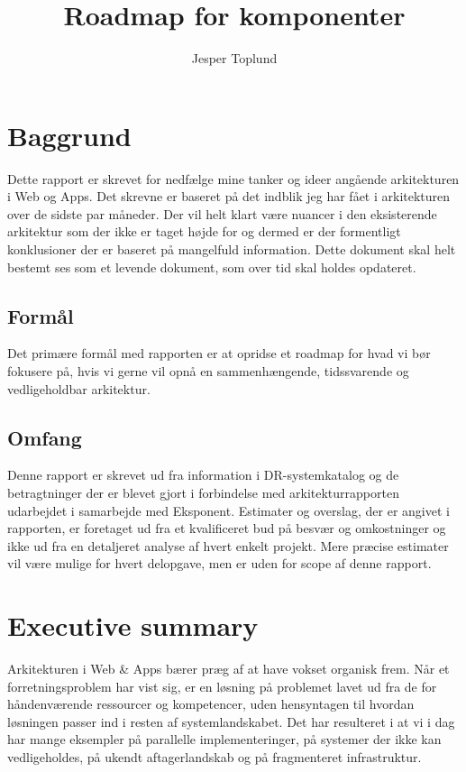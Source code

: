 \documentclass{article}
\author {Jesper Toplund}
\title{Roadmap for komponenter}
\date{}
\begin{document}
\maketitle

\vspace{20 mm}
\begin{quote}
    \textit{}
\end{quote}

\section{Baggrund}
Dette rapport er skrevet for nedfælge mine tanker og ideer angående arkitekturen i Web og Apps. Det skrevne er baseret på det indblik jeg har fået i arkitekturen over de sidste par måneder. Der vil helt klart være nuancer i den eksisterende arkitektur som der ikke er taget højde for og dermed er der formentligt konklusioner der er baseret på mangelfuld information. Dette dokument skal helt bestemt ses som et levende dokument, som over tid skal holdes opdateret.

\subsection{Formål}
Det primære formål med rapporten er at opridse et roadmap for hvad vi bør fokusere på, hvis vi gerne vil opnå en sammenhængende, tidssvarende og vedligeholdbar arkitektur.

\subsection{Omfang}
Denne rapport er skrevet ud fra information i DR-systemkatalog og de betragtninger der er blevet gjort i forbindelse med arkitekturrapporten udarbejdet i samarbejde med Eksponent. Estimater og overslag, der er angivet i rapporten, er foretaget ud fra et kvalificeret bud på besvær og omkostninger og ikke ud fra en detaljeret analyse af hvert enkelt projekt. Mere præcise estimater vil være mulige for hvert delopgave, men er uden for scope af denne rapport.

\section{Executive summary}
Arkitekturen i Web \& Apps bærer præg af at have vokset organisk frem. Når et forretningsproblem har vist sig, er en løsning på problemet lavet ud fra de for håndenværende ressourcer og kompetencer, uden hensyntagen til hvordan løsningen passer ind i resten af systemlandskabet. Det har resulteret i at vi i dag har mange eksempler på parallelle implementeringer, på systemer der ikke kan vedligeholdes, på ukendt aftagerlandskab og på fragmenteret infrastruktur.
\end{document}
